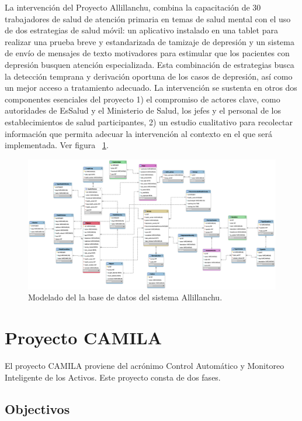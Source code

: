 La intervención del Proyecto Allillanchu, combina la capacitación de 30 trabajadores de salud de atención primaria en temas de salud mental con el uso de dos estrategias de salud móvil: un aplicativo instalado en una tablet para realizar una prueba breve y estandarizada de tamizaje de depresión y un sistema de envío de mensajes de texto motivadores para estimular que los pacientes con depresión busquen atención especializada. Esta combinación de estrategias busca la detección temprana y derivación oportuna de los casos de depresión, así como un mejor acceso a tratamiento adecuado. La intervención se sustenta en otros dos componentes esenciales del proyecto 1) el compromiso de actores clave, como autoridades de EsSalud y el Ministerio de Salud, los jefes y el personal de los establecimientos de salud participantes, 2) un estudio cualitativo para recolectar información que permita adecuar la intervención al contexto en el que será implementada. Ver figura ~\ref{fig:allillanchu-model}.

\begin{figure}
  \centering
  \includegraphics[scale=0.25]{images/activities/allillanchu/model.png}
  \caption{Modelado del la base de datos del sistema Allillanchu.}
  \label{fig:allillanchu-model}
\end{figure}

\clearpage


\section{Proyecto CAMILA}
El proyecto CAMILA proviene del acrónimo Control Automático y Monitoreo Inteligente de los Activos. Este proyecto consta de dos fases.

\subsection{Objectivos}

